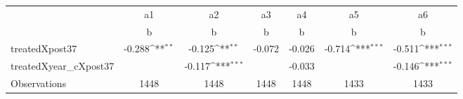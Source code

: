 {
\def\sym#1{\ifmmode^{#1}\else\(^{#1}\)\fi}
\begin{tabular}{l*{6}{c}}
\toprule
                    &          a1         &          a2         &          a3         &          a4         &          a5         &          a6         \\
                    &           b         &           b         &           b         &           b         &           b         &           b         \\
\midrule
treatedXpost37      &      -0.288\sym{**} &      -0.125\sym{**} &      -0.072         &      -0.026         &      -0.714\sym{***}&      -0.511\sym{***}\\
treatedXyear\_cXpost37&                     &      -0.117\sym{***}&                     &      -0.033         &                     &      -0.146\sym{***}\\
\midrule
Observations        &        1448         &        1448         &        1448         &        1448         &        1433         &        1433         \\
\bottomrule
\end{tabular}
}
